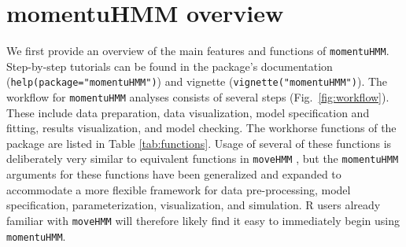 \documentclass[12pt]{article}\usepackage[]{graphicx}\usepackage[]{color}
\begin{document}
\section{momentuHMM overview}
We first provide an overview of the main features and functions of \verb|momentuHMM|. Step-by-step tutorials can be found in the package's documentation (\verb|help(package="momentuHMM")|) and vignette (\verb|vignette("momentuHMM")|). The workflow for \verb|momentuHMM| analyses consists of several steps (Fig.\ \ref{fig:workflow}). These include data preparation, data visualization, model specification and fitting, results visualization, and model checking. The workhorse functions of the package are listed in Table \ref{tab:functions}. Usage of several of these functions is deliberately very similar to equivalent functions in \verb|moveHMM| \citep{MichelotEtAl2016}, but the \verb|momentuHMM| arguments for these functions have been generalized and expanded to accommodate a more flexible framework for data pre-processing, model specification, parameterization, visualization, and simulation. R users already familiar with \verb|moveHMM| will therefore likely find it easy to immediately begin using \verb|momentuHMM|. %
\end{document}
